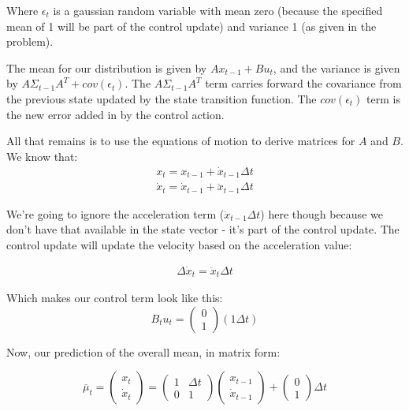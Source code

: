 \documentclass[10pt]{article}
\begin{document}
\begin{enumerate}
\begin{enumerate}
  Where $\epsilon_t$ is a gaussian random variable with mean zero (because the
  specified mean of 1 will be part of the control update) and variance 1 (as
  given in the problem).
 
  The mean for our distribution is given by $A x_{t-1} + B u_t$, and the
  variance is given by $A\Sigma_{t-1}A^T + cov(\epsilon_t)$. The
  $A\Sigma_{t-1}A^T$ term carries forward the covariance from the previous state
  updated by the state transition function. The $cov(\epsilon_t)$ term is the
  new error added in by the control action.

  All that remains is to use the equations of motion to derive matrices for $A$
  and $B$. We know that:
  \begin{gather}
    x_t = x_{t-1} + \dot{x}_{t-1} \Delta t \\ 
    \dot{x}_t = \dot{x}_{t-1} + \ddot{x}_{t-1} \Delta t
  \end{gather}

  We're going to ignore the acceleration term ($\ddot{x}_{t-1}\Delta t$) here
  though because we don't have that available in the state vector - it's part of
  the control update. The control update will update the velocity based on the
  acceleration value:

  \begin{gather}
    \Delta\dot{x}_t = \ddot{x}_t\Delta t 
  \end{gather}

  Which makes our control term look like this:
$$B_t u_t = \begin{pmatrix} 0 \\ 1\end{pmatrix} \left (1 \Delta t\right)$$

  Now, our prediction of the overall mean, in matrix form:

  $$
\overline{\mu}_t = \begin{pmatrix}x_t \\ \dot{x}_t\end{pmatrix} = 
\begin{pmatrix}1 & \Delta t \\ 0 & 1\end{pmatrix} \begin{pmatrix}x_{t-1} \\
\dot{x}_{t-1} \end{pmatrix}+
\begin{pmatrix}0 \\ 1\end{pmatrix} \Delta t
  $$


\end{enumerate}
\end{enumerate}
\end{document}
